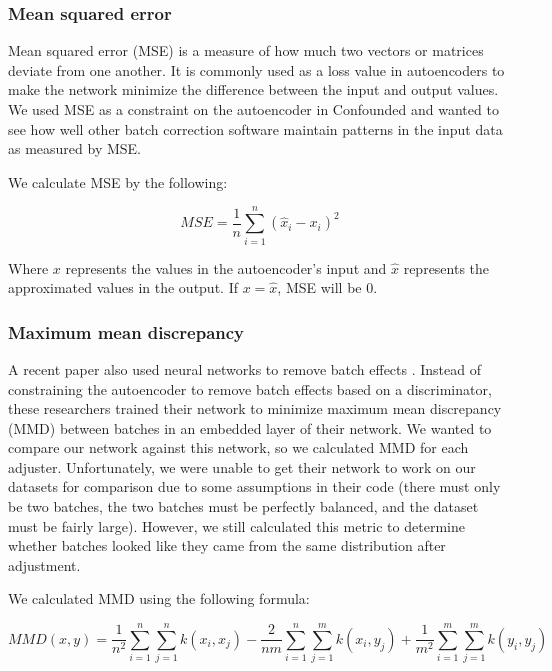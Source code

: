 \documentclass[notitlepage]{article}
\begin{document}
\subsubsection{Mean squared error}

Mean squared error (MSE) is a measure of how much two vectors or matrices deviate from one another.
It is commonly used as a loss value in autoencoders to make the network minimize the difference between the input and output values.
We used MSE as a constraint on the autoencoder in Confounded and wanted to see how well other batch correction software maintain patterns in the input data as measured by MSE.

We calculate MSE by the following:

\begin{equation}
	\label{mse}
	MSE = \frac{1}{n}\sum_{i=1}^n{(\hat{x}_i - x_i)^2}
\end{equation}

Where $x$ represents the values in the autoencoder's input and $\hat{x}$ represents the approximated values in the output.
If $x = \hat{x}$, MSE will be 0.

\subsubsection{Maximum mean discrepancy} \label{section:mmd}

A recent paper also used neural networks to remove batch effects \cite{shaham_removal_2017}.
Instead of constraining the autoencoder to remove batch effects based on a discriminator, these researchers trained their network to minimize maximum mean discrepancy (MMD) between batches in an embedded layer of their network.
We wanted to compare our network against this network, so we calculated MMD for each adjuster.
Unfortunately, we were unable to get their network to work on our datasets for comparison due to some assumptions in their code (there must only be two batches, the two batches must be perfectly balanced, and the dataset must be fairly large).
However, we still calculated this metric to determine whether batches looked like they came from the same distribution after adjustment.

We calculated MMD using the following formula:

\begin{equation}
	\label{mmd}
	MMD(x, y) = \frac{1}{n^2}\sum_{i=1}^n{\sum_{j=1}^n{k(x_i, x_j)}} - \frac{2}{nm}\sum_{i=1}^n{\sum_{j=1}^m{k(x_i, y_j)}} + \frac{1}{m^2}\sum_{i=1}^m{\sum_{j=1}^m{k(y_i, y_j)}}
\end{equation}
\end{document}
